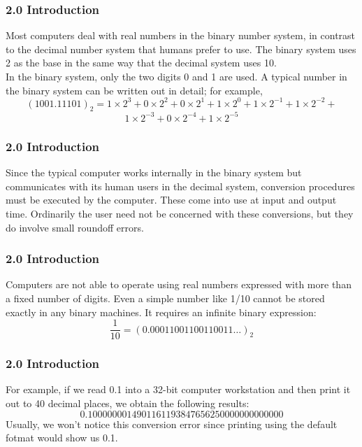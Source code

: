\documentclass[notheorems,mathserif,table,compress]{beamer}  %
\begin{document}
\begin{frame}
  \frametitle{2.0 Introduction}
  Most computers deal with real numbers in the binary number system, in contrast to the decimal number system that humans prefer to use. The   binary system uses 2 as the base in the same way that the decimal system uses 10. \\
  In the binary system, only the two digits 0 and 1 are used. A typical number in the binary system can be written out in detail; for example, 
  \begin{displaymath}
  (1001.11101)_2 = 1 \times 2^3 +0 \times 2^2 +0 \times 2^1 + 1 \times 2^0 + 1 \times 2^{-1} + 1 \times 2^{-2} + 
  \end{displaymath}
  \begin{displaymath}
  1 \times 2^{-3} + 0 \times 2^{-4} + 1 \times 2^{-5}
  \end{displaymath}
\end{frame}


\begin{frame}
  \frametitle{2.0 Introduction}
  Since the typical computer works internally in the binary system but communicates with its human users in the decimal system, conversion procedures must be executed by the computer. These come into use at input and output time. Ordinarily the user need not be concerned with these conversions, but they do involve small roundoff errors.
\end{frame}


\begin{frame}
  \frametitle{2.0 Introduction}
  Computers are not able to operate using real numbers expressed with more than a fixed number of digits. Even a simple number like 1/10 cannot be stored exactly in any binary machines. It requires an infinite binary expression:
  \begin{displaymath}
  \frac{1}{10} =(0.00011001100110011\ldots)_2
  \end{displaymath}
\end{frame}


\begin{frame}
  \frametitle{2.0 Introduction}
  For example, if we read 0.1 into a 32-bit computer workstation and then print it out to 40 decimal places, we obtain the following results:
  \begin{displaymath}
  0.1000000014901161193847656250000000000000
  \end{displaymath}
  Usually, we won't notice this conversion error since printing using the default fotmat would show us 0.1.
\end{frame}
\end{document}
